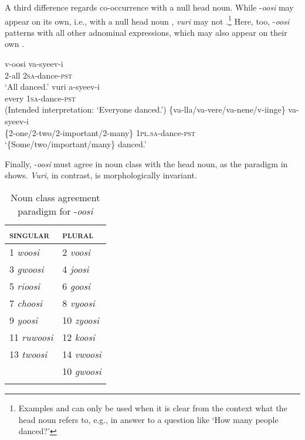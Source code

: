 \documentclass[output=paper]{langsci/langscibook}
\begin{document}
A third difference regards co-occurrence with a null head noun. While -\textit{oosi} may appear on its own, i.e., with a null head noun , \textit{vuri} may not .\footnote{Examples  and  can only be used when it is clear from the context what the head noun refers to, e.g., in answer to a question like ‘How many people danced?’} Here, too, -\textit{oosi} patterns with all other adnominal expressions, which may also appear on their own .

\ea\label{ex:landman:13}
\ea\label{ex:landman:13a}
\gll v-oosi    va-syeev-i      \\
     2-all    2\textsc{sa}-dance-\textsc{pst}\\
\glt ‘All danced.’
\ex\label{ex:landman:13b}
\gll *vuri    a-syeev-i  \\
     every    1\textsc{sa}-dance-\textsc{pst}\\
\glt (Intended interpretation: ‘Everyone danced.’)
\ex\label{ex:landman:13c}
\gll \{va-lla/va-vere/va-nene/v-iinge\}  va-syeev-i\\
     \{2-one/2-two/2-important/2-many\}  1\textsc{pl}.\textsc{sa}-dance-\textsc{pst}\\
\glt ‘\{Some/two/important/many\} danced.’
\z
\z

  Finally, -\textit{oosi} must agree in noun class with the head noun, as the paradigm in  shows. \textit{Vuri}, in contrast, is morphologically invariant.

\begin{table}
\caption{Noun class agreement paradigm for -\textit{oosi}}
\label{tab:1}
\begin{tabularx}{\textwidth}{XX}
\lsptoprule
\textsc{singular} & \textsc{plural}\\
\midrule
1  \textit{woosi} & 2  \textit{voosi}\\

3  \textit{gwoosi} & 4  \textit{joosi}\\

5  \textit{rioosi} & 6  \textit{goosi}\\

7  \textit{choosi} & 8  \textit{vyoosi} \\

9  \textit{yoosi} & 10  \textit{zyoosi} \\

11  \textit{ruwoosi} & 12  \textit{koosi}\\

13  \textit{twoosi} & 14  \textit{vwoosi}\\

& 10  \textit{gwoosi}\\
\lspbottomrule
\end{tabularx}
\end{table}
\end{document}
